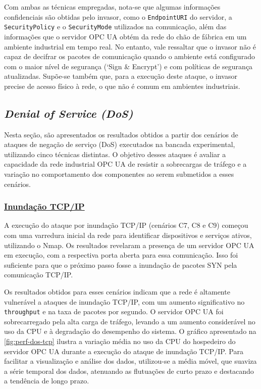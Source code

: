        Com ambas as técnicas empregadas, nota-se que algumas informações confidenciais são obtidas pelo invasor, como o \texttt{EndpointURI} do servidor, a \texttt{SecurityPolicy} e o \texttt{SecurityMode} utilizados na comunicação, além das informações que o servidor OPC UA obtém da rede do chão de fábrica em um ambiente industrial em tempo real. No entanto, vale ressaltar que o invasor não é capaz de decifrar os pacotes de comunicação quando o ambiente está configurado com o maior nível de segurança (`Sign \& Encrypt') e com políticas de segurança atualizadas. Supõe-se também que, para a execução deste ataque, o invasor precise de acesso físico à rede, o que não é comum em ambientes industriais.

    \subsection{\textit{Denial of Service (DoS)}}

        Nesta seção, são apresentados os resultados obtidos a partir dos cenários de ataques de negação de serviço (DoS) executados na bancada experimental, utilizando cinco técnicas distintas. O objetivo desses ataques é avaliar a capacidade da rede industrial OPC UA de resistir a sobrecargas de tráfego e a variação no comportamento dos componentes ao serem submetidos a esses cenários.

        \subsubsection*{\underline{Inundação TCP/IP}}

            A execução do ataque por inundação TCP/IP (cenários C7, C8 e C9) começou com uma varredura inicial da rede para identificar dispositivos e serviços ativos, utilizando o Nmap. Os resultados revelaram a presença de um servidor OPC UA em execução, com a respectiva porta aberta para essa comunicação. Isso foi suficiente para que o próximo passo fosse a inundação de pacotes SYN pela comunicação TCP/IP.

            Os resultados obtidos para esses cenários indicam que a rede é altamente vulnerável a ataques de inundação TCP/IP, com um aumento significativo no \texttt{throughput} e na taxa de pacotes por segundo. O servidor OPC UA foi sobrecarregado pela alta carga de tráfego, levando a um aumento considerável no uso da CPU e à degradação do desempenho do sistema. O gráfico apresentado na \autoref{fig:perf-dos-tcp} ilustra a variação média no uso da CPU do hospedeiro do servidor OPC UA durante a execução do ataque de inundação TCP/IP. Para facilitar a visualização e análise dos dados, utilizou-se a média móvel, que suaviza a série temporal dos dados, atenuando as flutuações de curto prazo e destacando a tendência de longo prazo.

